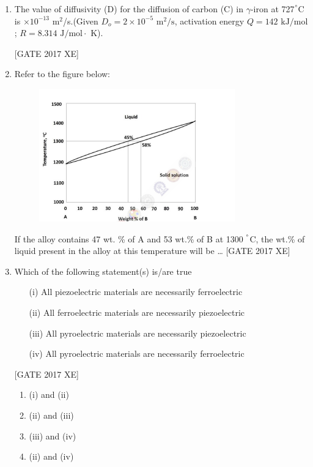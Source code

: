 \documentclass[journal,12pt,onecolumn]{IEEEtran}
\theoremstyle{remark}
\begin{document}
\begin{enumerate}
\item The value of diffusivity (D) for the diffusion of carbon (C) in $\gamma$-iron at 727$^\degree$C is \underline{\hspace{2cm}} $\times 10^{-13}$ m$^2$/s.(Given $D_{o}=2\times10^{-5}\text{ m}^{2}/\text{s}$, activation energy $Q=142\text{ kJ/mol}$; $R=8.314\text{ J/mol}\cdot\text{ K}$). 

\hfill [GATE 2017 XE]

 \item Refer to the figure below:\\
\begin{figure}[H]
    \centering
    \includegraphics[width=0.5\linewidth]{figs/fig9.png}
    \caption{}
    \label{fig:fig9}
\end{figure}

If the alloy contains 47 wt. \% of A and 53 wt.\% of B at 1300 $^\degree$C, the wt.\% of liquid present in the alloy at this temperature will be \ldots
\hfill [GATE 2017 XE]

\item Which of the following statement(s) is/are true  
\begin{enumerate}
    \item[(i)] All piezoelectric materials are necessarily ferroelectric  
    \item[(ii)] All ferroelectric materials are necessarily piezoelectric  
    \item[(iii)] All pyroelectric materials are necessarily piezoelectric  
    \item[(iv)] All pyroelectric materials are necessarily ferroelectric  
\end{enumerate}
\hfill [GATE 2017 XE]

\begin{multicols}{2}
\begin{enumerate}
    \item (i) and (ii)
    \item (ii) and (iii)
    \item (iii) and (iv)
    \item (ii) and (iv)
\end{enumerate}
\end{multicols}


\end{enumerate}
\end{document}
